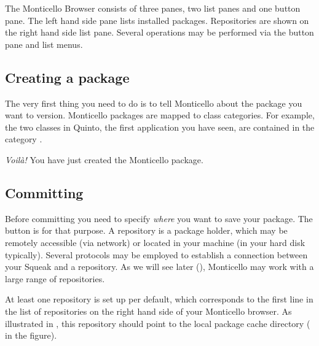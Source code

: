 \documentclass[a4paper,10pt,twoside]{book}
\begin{document}
The Monticello Browser consists of three panes, two list panes and one button pane. The left hand side pane lists installed packages. Repositories are shown on the right hand side list pane. Several operations may be performed via the button pane and list menus.

\subsection{Creating a package}

The very first thing you need to do is to tell Monticello about the package you want to version. Monticello packages are mapped to class categories. For example, the two classes in Quinto, the first application you have seen, are contained in the category . 


\emph{Voil\`a!} You have just created the  Monticello package. 


\subsection{Committing}

Before committing you need to specify \emph{where} you want to save your package. The  button is for that purpose. A repository is a package holder, which may be remotely accessible (via network) or located in your machine (in your hard disk typically). Several protocols may be employed to establish a connection between your Squeak and a repository. As we will see later (), Monticello may work with a large range of repositories.


At least one repository is set up per default, which corresponds to the first line in the list of repositories on the right hand side of your Monticello browser. As illustrated in , this repository should point to the local package cache directory ( in the figure).
\end{document}
